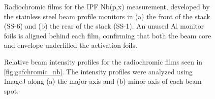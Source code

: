     



\begin{figure}
    \centering
    \caption{Radiochromic films for the IPF Nb(p,x) measurement, developed by the stainless steel beam profile monitors in (a) the front of the stack (SS-6) and (b) the rear of the stack (SS-1). An unused Al monitor foils is aligned behind each film, confirming that both the beam core and envelope underfilled the activation foils.}
     \label{fig:gafchromic_fe}
\end{figure}




\begin{figure}
    \centering
    \caption{Relative beam intensity profiles for the radiochromic films seen in \autoref{fig:gafchromic_nb}. The intensity profiles were analyzed using ImageJ along (a) the major axis and (b) minor axis of each beam spot. }
     \label{fig:gafchromic_fe_profiles}
\end{figure}




